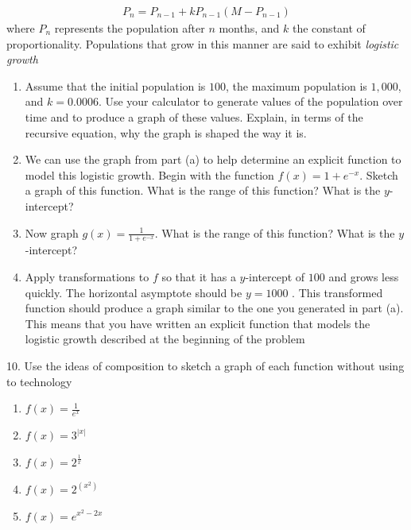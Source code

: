 \documentclass[10pt,]{book}
\theoremstyle{plain}
\theoremstyle{definition}
\theoremstyle{definition}
\theoremstyle{definition}
\numberwithin{equation}{section}
\begin{document}
\begin{exerciselist}
%
\begin{gather*}
P_n = P_{n-1} + kP_{n-1} \left( M - P_{n-1} \right)
\end{gather*}
\hypertarget{p-268}{}%
where \(P_n\) represents the population after \(n\) months, and \(k\) the constant of proportionality.  Populations that grow in this manner are said to exhibit \emph{logistic growth}%
\leavevmode%
\begin{enumerate}[label=(\alph*)]
\item\hypertarget{li-154}{}Assume that the initial population is \(100\), the maximum population is \(1,000\), and \(k = 0.0006\).  Use your calculator to generate values of the population over time and to produce a graph of these values.  Explain, in terms of the recursive equation, why the graph is shaped the way it is.%
\item\hypertarget{li-155}{}We can use the graph from part (a) to help determine an explicit function to model this logistic growth.  Begin with the function \(f(x) = 1 + e^{-x}\).  Sketch a graph of this function.  What is the range of this function?  What is the \(y\)-intercept?%
\item\hypertarget{li-156}{}Now graph \(g(x) = \frac{1}{1+e^{-x}}\).  What is the range of this function?  What is the \(y\)-intercept?%
\item\hypertarget{li-157}{}Apply transformations to \(f\) so that it has a \(y\)-intercept of \(100\) and grows less quickly.  The horizontal asymptote should be \(y = 1000\) .  This transformed function should produce a graph similar to the one you generated in part (a). This means that you have written an explicit function that models the logistic growth described at the beginning of the problem%
\end{enumerate}
\par\smallskip
\item[10.]\hypertarget{exercise-71}{}\hypertarget{p-269}{}%
Use the ideas of composition to sketch a graph of each function without using to technology%
\leavevmode%
\begin{enumerate}[label=(\alph*)]
\item\hypertarget{li-158}{}\(f(x)=\frac{1}{e^x}\)%
\item\hypertarget{li-159}{}\(f(x)=3^{|x|}\)%
\item\hypertarget{li-160}{}\(f(x)=2^{\frac{1}{x}}\)%
\item\hypertarget{li-161}{}\(f(x)=2^{\left(x^2\right)}\)%
\item\hypertarget{li-162}{}\(f(x)=e^{x^2-2x}\)%

\end{enumerate}
\end{exerciselist}
\end{document}
